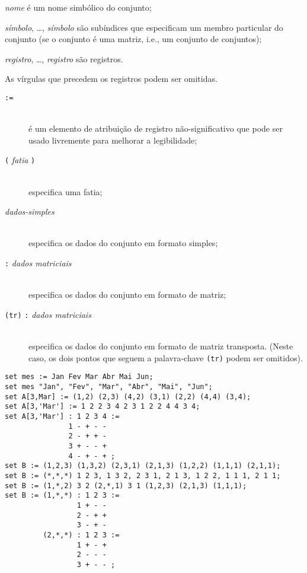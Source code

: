 \documentclass[11pt, brazil]{report}
\def\para#1{\noindent{\bf#1}}
\begin{document}
\medskip

\noindent
{\it nome} é um nome simbólico do conjunto;

\noindent
{\it símbolo}, \dots, {\it símbolo} são subíndices que especificam
um membro particular do conjunto \linebreak(se o conjunto é uma matriz, i.e.,
um conjunto de conjuntos);

\noindent
{\it registro}, \dots, {\it registro} são registros.

\noindent
As vírgulas que precedem os registros podem ser omitidas.

\para{Registros}

\vspace*{-8pt}

\begin{description}
\item[{\tt :=}]\hspace*{0pt}\\
é um elemento de atribuição de registro não-significativo que pode ser usado
livremente para melhorar a legibilidade;
\item[{\tt(} {\it fatia} {\tt)}]\hspace*{0pt}\\
especifica uma fatia;
\item[{\it dados-simples}]\hspace*{0pt}\\
especifica os dados do conjunto em formato simples;
\item[{\tt:} {\it dados matriciais}]\hspace*{0pt}\\
especifica os dados do conjunto em formato de matriz;
\item[{\tt(tr)} {\tt:} {\it dados matriciais}]\hspace*{0pt}\\
especifica os dados do conjunto em formato de matriz transposta.
(Neste caso, os dois pontos que seguem a palavra-chave {\tt(tr)} podem ser omitidos).
\end{description}

\vspace*{-8pt}

\para{Exemplos}

\begin{verbatim}
set mes := Jan Fev Mar Abr Mai Jun;
set mes "Jan", "Fev", "Mar", "Abr", "Mai", "Jun";
set A[3,Mar] := (1,2) (2,3) (4,2) (3,1) (2,2) (4,4) (3,4);
set A[3,'Mar'] := 1 2 2 3 4 2 3 1 2 2 4 4 3 4;
set A[3,'Mar'] : 1 2 3 4 :=
               1 - + - -
               2 - + + -
               3 + - - +
               4 - + - + ;
set B := (1,2,3) (1,3,2) (2,3,1) (2,1,3) (1,2,2) (1,1,1) (2,1,1);
set B := (*,*,*) 1 2 3, 1 3 2, 2 3 1, 2 1 3, 1 2 2, 1 1 1, 2 1 1;
set B := (1,*,2) 3 2 (2,*,1) 3 1 (1,2,3) (2,1,3) (1,1,1);
set B := (1,*,*) : 1 2 3 :=
                 1 + - -
                 2 - + +
                 3 - + -
         (2,*,*) : 1 2 3 :=
                 1 + - +
                 2 - - -
                 3 + - - ;
\end{verbatim}
\end{document}
